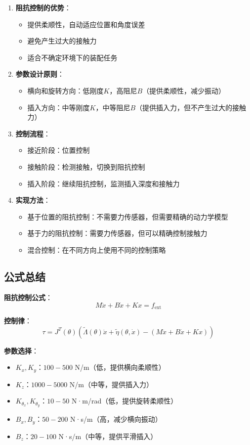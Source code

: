 \documentclass[12pt,a4paper]{article}
\begin{document}
\begin{enumerate}
\item \textbf{阻抗控制的优势}：
\begin{itemize}
\item 提供柔顺性，自动适应位置和角度误差
\item 避免产生过大的接触力
\item 适合不确定环境下的装配任务
\end{itemize}

\item \textbf{参数设计原则}：
\begin{itemize}
\item 横向和旋转方向：低刚度$K$，高阻尼$B$（提供柔顺性，减少振动）
\item 插入方向：中等刚度$K$，中等阻尼$B$（提供插入力，但不产生过大的接触力）
\end{itemize}

\item \textbf{控制流程}：
\begin{itemize}
\item 接近阶段：位置控制
\item 接触阶段：检测接触，切换到阻抗控制
\item 插入阶段：继续阻抗控制，监测插入深度和接触力
\end{itemize}

\item \textbf{实现方法}：
\begin{itemize}
\item 基于位置的阻抗控制：不需要力传感器，但需要精确的动力学模型
\item 基于力的阻抗控制：需要力传感器，但可以精确控制接触力
\item 混合控制：在不同方向上使用不同的控制策略
\end{itemize}
\end{enumerate}

\subsection{公式总结}

\textbf{阻抗控制公式}：
\begin{equation}
M\ddot{x} + B\dot{x} + Kx = f_{\text{ext}}
\end{equation}

\textbf{控制律}：
\begin{equation}
\tau = J^T(\theta)\left(\tilde{\Lambda}(\theta)\ddot{x} + \tilde{\eta}(\theta, \dot{x}) - (M\ddot{x} + B\dot{x} + Kx)\right)
\end{equation}

\textbf{参数选择}：
\begin{itemize}
\item $K_x, K_y$：$100-500$ N/m（低，提供横向柔顺性）
\item $K_z$：$1000-5000$ N/m（中等，提供插入力）
\item $K_{\theta_x}, K_{\theta_y}$：$10-50$ N·m/rad（低，提供旋转柔顺性）
\item $B_x, B_y$：$50-200$ N·s/m（高，减少横向振动）
\item $B_z$：$20-100$ N·s/m（中等，提供平滑插入）
\end{itemize}
\end{document}
